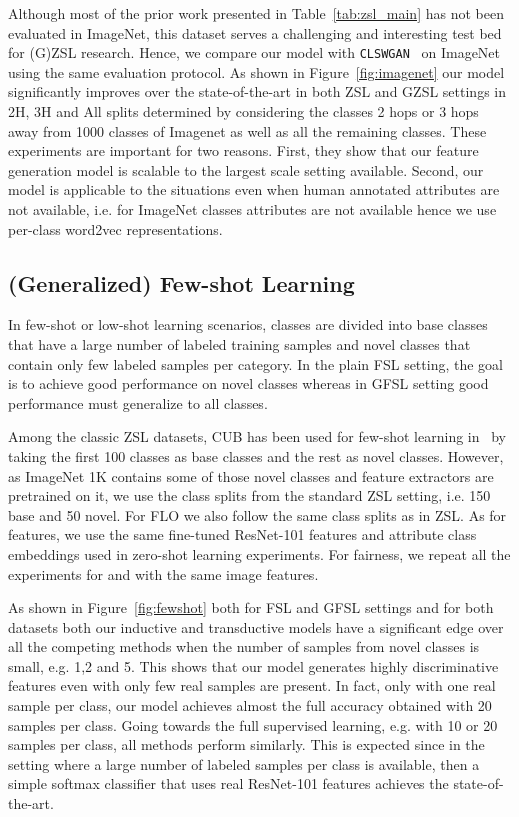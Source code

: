 \documentclass[10pt,twocolumn,letterpaper]{article}
\newcommand{\myparagraph}[1]{\vspace{5pt}\noindent{\bf #1}}
\begin{document}
\myparagraph{Large-scale experiments.} Although most of the prior work presented in Table~\ref{tab:zsl_main} has not been evaluated in ImageNet, this dataset serves a challenging and interesting test bed for (G)ZSL research. Hence, we compare our model with \texttt{CLSWGAN}~\cite{XLSA18} on ImageNet using the same evaluation protocol. As shown in Figure~\ref{fig:imagenet} our model significantly improves over the state-of-the-art in both ZSL and GZSL settings in 2H, 3H and All splits determined by considering the classes 2 hops or 3 hops away from 1000 classes of Imagenet as well as all the remaining classes. These experiments are important for two reasons. First, they show that our feature generation model is scalable to the largest scale setting available. Second, our model is applicable to the situations even when human annotated attributes are not available, i.e. for ImageNet classes attributes are not available hence we use per-class word2vec representations.



\subsection{(Generalized) Few-shot Learning}
In few-shot or low-shot learning scenarios, classes are divided into base classes that have a large number of labeled training samples and novel classes that contain only few labeled samples per category. In the plain FSL setting, the goal is to achieve good performance on novel classes whereas in GFSL setting good performance must generalize to all classes. 

Among the classic ZSL datasets, CUB has been used for few-shot learning in~\cite{qi2018low} by taking the first 100 classes as base classes and the rest as novel classes. However, as ImageNet 1K contains some of those novel classes and feature extractors are pretrained on it, we use the class splits from the standard ZSL setting, i.e. 150 base and 50 novel. For FLO we also follow the same class splits as in ZSL. As for features, we use the same fine-tuned ResNet-101 features and attribute class embeddings used in zero-shot learning experiments. For fairness, we repeat all the experiments for \cite{qi2018low} and \cite{HG16} with the same image features.

\myparagraph{Comparing with the state-of-the-art.} As shown in Figure~\ref{fig:fewshot} both for FSL and GFSL settings and for both datasets both our inductive and transductive models have a significant edge over all the competing methods when the number of samples from novel classes is small, e.g. 1,2 and 5. This shows that our model generates highly discriminative features even with only few real samples are present. In fact, only with one real sample per class, our model achieves almost the full accuracy obtained with 20 samples per class. Going towards the full supervised learning, e.g. with 10 or 20 samples per class, all methods perform similarly. This is expected since in the setting where a large number of labeled samples per class is available, then a simple softmax classifier that uses real ResNet-101 features achieves the state-of-the-art.
\end{document}
